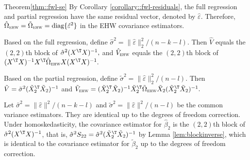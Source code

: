 \begin{myproof}{Theorem}{\ref{thm::fwl-se}}
By Corollary \ref{corollary::fwl-residuals}, the full regression and partial regression have the same residual vector, denoted by $\hat{ \varepsilon}$. Therefore, 
$\hat{\Omega}_\textsc{ehw} = \tilde{\Omega}_\textsc{ehw} = \text{diag}\{ \hat{\varepsilon}^2\}$ in the EHW covariance estimators. 

Based on the full regression, define $\hat{\sigma}^2 = \| \hat{ \varepsilon} \|_2^2/(n-k-l)$.  Then $\hat{V}$ equals the $(2,2)$th block of
$
  \hat{\sigma}^2 (X^{\T} X)^{-1} ,
$
and $\hat{V}_{\textsc{ehw}}$ equals the $(2,2)$th block of
$
  (X^{\T} X)^{-1} X^{\T} \hat{\Omega}_\textsc{ehw} X (X^{\T}X)^{-1}.
$ 

Based on the partial regression, define $\tilde{\sigma}^2 = \| \hat{\varepsilon}\|_2^2/(n-l)$.  Then $
\tilde{V} =   \tilde{\sigma}^2 ( \tilde{X}_2 ^{\T} \tilde{X}_2)^{-1} 
$  and $
\tilde{V}_{\textsc{ehw}} = ( \tilde{X}_2 ^{\T} \tilde{X}_2)^{-1}  \tilde{X}_2^{\T}  \tilde{\Omega}_\textsc{ehw} \tilde{X}_2  ( \tilde{X}_2 ^{\T} \tilde{X}_2)^{-1}. 
$

 



Let $\hat{\sigma}^2 = \| \hat{ \varepsilon} \|^2/(n-k-l)$ and $\tilde{\sigma}^2 = \|  \hat{ \varepsilon} \|^2/(n-l)$ be the common variance estimators. They are identical up to the degrees of freedom correction. 
Under homoskedasticity, the covariance estimator for $\hat{\beta}_2$ is the $(2,2)$th block of $\hat{\sigma}^2 (X ^{\T} X)^{-1}$, that is, $ \hat{\sigma}^2   S_{22} = \hat{\sigma}^2  ( \tilde{X}_2 ^{\T} \tilde{X}_2 )^{-1}$ by Lemma \ref{lem:blockinverse}, which is identical to the covariance estimator for $\tilde{\beta}_2$ up to the degrees of freedom correction. 



\end{myproof}
